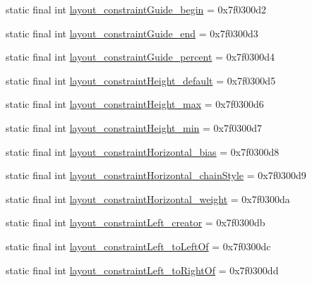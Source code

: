 \begin{DoxyCompactItemize}
\item 
static final int \mbox{\hyperlink{classandroid_1_1support_1_1constraint_1_1R_1_1attr_a31c18d22856c2dedb40ec7e5ed548323}{layout\+\_\+constraint\+Guide\+\_\+begin}} = 0x7f0300d2
\item 
static final int \mbox{\hyperlink{classandroid_1_1support_1_1constraint_1_1R_1_1attr_a8fc60167fe4318760806ea3ab395c06a}{layout\+\_\+constraint\+Guide\+\_\+end}} = 0x7f0300d3
\item 
static final int \mbox{\hyperlink{classandroid_1_1support_1_1constraint_1_1R_1_1attr_a89c6858d46139a868584aeb07fc15b06}{layout\+\_\+constraint\+Guide\+\_\+percent}} = 0x7f0300d4
\item 
static final int \mbox{\hyperlink{classandroid_1_1support_1_1constraint_1_1R_1_1attr_ad73139cb634d6cba3b7102b3dc13308d}{layout\+\_\+constraint\+Height\+\_\+default}} = 0x7f0300d5
\item 
static final int \mbox{\hyperlink{classandroid_1_1support_1_1constraint_1_1R_1_1attr_a3035da0c0acb489260346cd375b58db9}{layout\+\_\+constraint\+Height\+\_\+max}} = 0x7f0300d6
\item 
static final int \mbox{\hyperlink{classandroid_1_1support_1_1constraint_1_1R_1_1attr_af07c577057f28eee1bd57df165fb790a}{layout\+\_\+constraint\+Height\+\_\+min}} = 0x7f0300d7
\item 
static final int \mbox{\hyperlink{classandroid_1_1support_1_1constraint_1_1R_1_1attr_a3f57762e96618741e86fa450a044fda8}{layout\+\_\+constraint\+Horizontal\+\_\+bias}} = 0x7f0300d8
\item 
static final int \mbox{\hyperlink{classandroid_1_1support_1_1constraint_1_1R_1_1attr_ae4c773b8f26637ab88042d5e2114ef25}{layout\+\_\+constraint\+Horizontal\+\_\+chain\+Style}} = 0x7f0300d9
\item 
static final int \mbox{\hyperlink{classandroid_1_1support_1_1constraint_1_1R_1_1attr_a18d864472580035464d939072ecc8599}{layout\+\_\+constraint\+Horizontal\+\_\+weight}} = 0x7f0300da
\item 
static final int \mbox{\hyperlink{classandroid_1_1support_1_1constraint_1_1R_1_1attr_aca559da74ff0a015aff1f0db73de313b}{layout\+\_\+constraint\+Left\+\_\+creator}} = 0x7f0300db
\item 
static final int \mbox{\hyperlink{classandroid_1_1support_1_1constraint_1_1R_1_1attr_a7b56182d29aaed93f590f34f27840cbd}{layout\+\_\+constraint\+Left\+\_\+to\+Left\+Of}} = 0x7f0300dc
\item 
static final int \mbox{\hyperlink{classandroid_1_1support_1_1constraint_1_1R_1_1attr_a5da7221e5f62e6b75cc78058a3d546e4}{layout\+\_\+constraint\+Left\+\_\+to\+Right\+Of}} = 0x7f0300dd

\end{DoxyCompactItemize}
